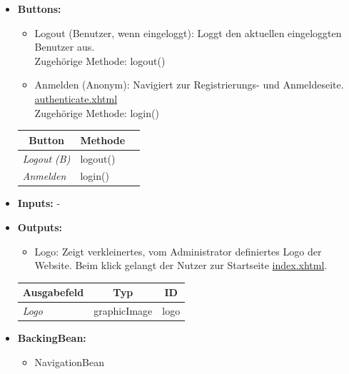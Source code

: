 \begin{itemize}
			\item \textbf{Buttons:}
				\begin{itemize}
					\item Logout (Benutzer, wenn eingeloggt): Loggt den aktuellen eingeloggten Benutzer aus. \\ Zugehörige Methode: logout()
					\item Anmelden (Anonym): Navigiert zur Registrierungs- und Anmeldeseite. \hyperlink{authenticate}{authenticate.xhtml} \\ Zugehörige Methode: login()
				\end{itemize}
				\begin{center}
					\begin{longtable}{|p{4cm} |p{4cm} | p{4cm}|}
					
						\hline \multicolumn{1}{|c|}{\textbf{Button}} & \multicolumn{1}{|c|}{\textbf{Methode}} \\ \hline
						\endfirsthead
						\hline
						\endlastfoot
					
							\textit{Logout (B)} & logout()\\ \hline
							\textit{Anmelden} & login()\\ \hline
					\end{longtable}
				\end{center}
			\item \textbf{Inputs:} -
			\item \textbf{Outputs:}
				\begin{itemize}
					\item Logo: Zeigt verkleinertes, vom Administrator definiertes Logo der Website. Beim klick gelangt der Nutzer zur Startseite \hyperlink{index}{index.xhtml}.
				\end{itemize}
				\begin{center}
					\begin{longtable}{|p{5cm} | p{4cm}|p{3cm}|}
						
						\hline \multicolumn{1}{|c|}{\textbf{Ausgabefeld}} & \multicolumn{1}{|c|}{\textbf{Typ}}  &  \multicolumn{1}{|c|}{\textbf{ID}} \\ \hline
						\endfirsthead
						\hline
						\endlastfoot
						\textit{Logo}  & graphicImage & logo \\ \hline
					\end{longtable}
				\end{center}
			\item \textbf{BackingBean:}
				\begin{itemize}
					\item NavigationBean
				\end{itemize}
		\end{itemize}
		
